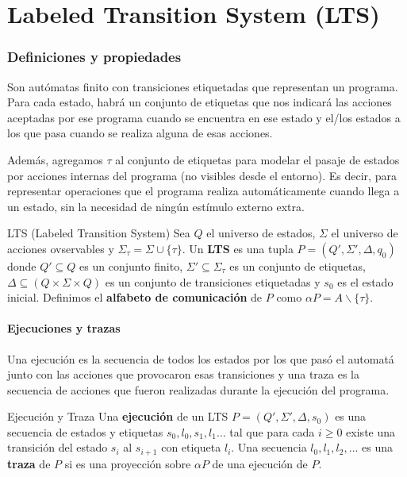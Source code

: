 \part{Labeled Transition System (LTS)}

\section{Definiciones y propiedades}

Son autómatas finito con transiciones etiquetadas que representan un programa. Para cada estado, habrá un conjunto de etiquetas que nos indicará las acciones aceptadas por ese programa cuando se encuentra en ese estado y el/los estados a los que pasa cuando se realiza alguna de esas acciones.

Además, agregamos $\tau$ al conjunto de etiquetas para modelar el pasaje de estados por acciones internas del programa (no visibles desde el entorno). Es decir, para representar operaciones que el programa realiza automáticamente cuando llega a un estado, sin la necesidad de ningún estímulo externo extra.

\begin{definicion}{LTS (Labeled Transition System)}
Sea $Q$ el universo de estados, $\Sigma$ el universo de acciones ovservables y $\Sigma_\tau= \Sigma\cup\{\tau\}$. Un \textbf{LTS} es una tupla $P = (Q', \Sigma', \Delta, q_0)$ donde $Q'\subseteq Q$ es un conjunto finito, $\Sigma'\subseteq \Sigma_\tau$ es un conjunto de etiquetas, $\Delta\subseteq (Q\times \Sigma \times Q )$ es un conjunto de transiciones etiquetadas y $s_0$ es el estado inicial. Definimos el \textbf{alfabeto de comunicación} de $P$ como $\alpha P = A \backslash \{\tau\}$.
\end{definicion}

\subsection{Ejecuciones y trazas}
Una ejecución es la secuencia de todos los estados por los que pasó el automatá junto con las acciones que provocaron esas transiciones y una traza es la secuencia de acciones que fueron realizadas durante la ejecución del programa.

\begin{definicion}{Ejecución y Traza}
Una \textbf{ejecución} de un LTS $P = (Q', \Sigma', \Delta, s_0)$ es una secuencia de estados y etiquetas $s_0,l_0,s_1,l_1\dots$ tal que para cada $i\geq 0$ existe una transición del estado $s_i$ al $s_{i+1}$ con etiqueta $l_i$. Una secuencia $l_0, l_1,l_2,\dots$ es una \textbf{traza} de $P$ si es una proyección sobre $\alpha P$ de una ejecución de $P$.
\end{definicion}

